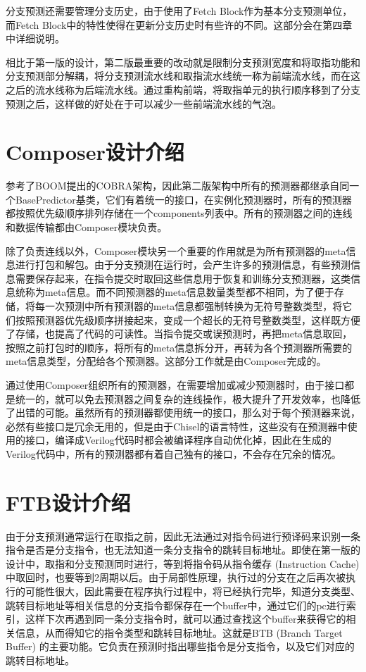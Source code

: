 分支预测还需要管理分支历史，由于使用了Fetch Block作为基本分支预测单位，而Fetch Block中的特性使得在更新分支历史时有些许的不同。这部分会在第四章中详细说明。

相比于第一版的设计，第二版最重要的改动就是限制分支预测宽度和将取指功能和分支预测部分解耦，将分支预测流水线和取指流水线统一称为前端流水线，而在这之后的流水线称为后端流水线。通过重构前端，将取指单元的执行顺序移到了分支预测之后，这样做的好处在于可以减少一些前端流水线的气泡。

\section{Composer设计介绍}

参考了BOOM提出的COBRA架构，因此第二版架构中所有的预测器都继承自同一个BasePredictor基类，它们有着统一的接口，在实例化预测器时，所有的预测器都按照优先级顺序排列存储在一个components列表中。所有的预测器之间的连线和数据传输都由Composer模块负责。

除了负责连线以外，Composer模块另一个重要的作用就是为所有预测器的meta信息进行打包和解包。由于分支预测在运行时，会产生许多的预测信息，有些预测信息需要保存起来，在指令提交时取回这些信息用于恢复和训练分支预测器，这类信息统称为meta信息。而不同预测器的meta信息数量类型都不相同，为了便于存储，将每一次预测中所有预测器的meta信息都强制转换为无符号整数类型，将它们按照预测器优先级顺序拼接起来，变成一个超长的无符号整数类型，这样既方便了存储，也提高了代码的可读性。当指令提交或误预测时，再把meta信息取回，按照之前打包时的顺序，将所有的meta信息拆分开，再转为各个预测器所需要的meta信息类型，分配给各个预测器。这部分工作就是由Composer完成的。

通过使用Composer组织所有的预测器，在需要增加或减少预测器时，由于接口都是统一的，就可以免去预测器之间复杂的连线操作，极大提升了开发效率，也降低了出错的可能。虽然所有的预测器都使用统一的接口，那么对于每个预测器来说，必然有些接口是冗余无用的，但是由于Chisel的语言特性，这些没有在预测器中使用的接口，编译成Verilog代码时都会被编译程序自动优化掉，因此在生成的Verilog代码中，所有的预测器都有着自己独有的接口，不会存在冗余的情况。

\section{FTB设计介绍}

由于分支预测通常运行在取指之前，因此无法通过对指令码进行预译码来识别一条指令是否是分支指令，也无法知道一条分支指令的跳转目标地址。即使在第一版的设计中，取指和分支预测同时进行，等到将指令码从指令缓存 (Instruction Cache) 中取回时，也要等到2周期以后。由于局部性原理，执行过的分支在之后再次被执行的可能性很大，因此需要在程序执行过程中，将已经执行完毕，知道分支类型、跳转目标地址等相关信息的分支指令都保存在一个buffer中，通过它们的pc进行索引，这样下次再遇到同一条分支指令时，就可以通过查找这个buffer来获得它的相关信息，从而得知它的指令类型和跳转目标地址。这就是BTB (Branch Target Buffer) 的主要功能。它负责在预测时指出哪些指令是分支指令，以及它们对应的跳转目标地址。

